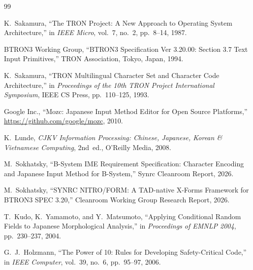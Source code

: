 \documentclass[10pt,journal,compsoc,twocolumn]{article}
\begin{document}
\begin{thebibliography}{99}

K.~Sakamura, ``The TRON Project: A New Approach to Operating System Architecture,'' in \emph{IEEE Micro}, vol.~7, no.~2, pp.~8--14, 1987.

BTRON3 Working Group, ``BTRON3 Specification Ver 3.20.00: Section 3.7 Text Input Primitives,'' TRON Association, Tokyo, Japan, 1994.

K.~Sakamura, ``TRON Multilingual Character Set and Character Code Architecture,'' in \emph{Proceedings of the 10th TRON Project International Symposium}, IEEE CS Press, pp.~110--125, 1993.

Google Inc., ``Mozc: Japanese Input Method Editor for Open Source Platforms,'' \url{https://github.com/google/mozc}, 2010.

K.~Lunde, \emph{CJKV Information Processing: Chinese, Japanese, Korean \& Vietnamese Computing}, 2nd~ed., O'Reilly Media, 2008.

M.~Sokhatsky, ``B-System IME Requirement Specification: Character Encoding and Japanese Input Method for B-System,'' Synrc Cleanroom Report, 2026.

M.~Sokhatsky, ``SYNRC NITRO/FORM: A TAD-native X-Forms Framework for BTRON3 SPEC 3.20,'' Cleanroom Working Group Research Report, 2026.

T.~Kudo, K.~Yamamoto, and Y.~Matsumoto, ``Applying Conditional Random Fields to Japanese Morphological Analysis,'' in \emph{Proceedings of EMNLP 2004}, pp.~230--237, 2004.

G.~J.~Holzmann, ``The Power of 10: Rules for Developing Safety-Critical Code,'' in \emph{IEEE Computer}, vol.~39, no.~6, pp.~95--97, 2006.

\end{thebibliography}
\end{document}
